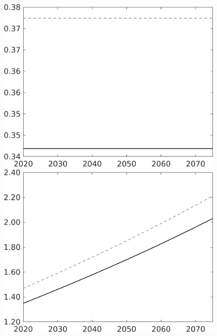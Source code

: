 \documentclass[12pt]{article}
\begin{document}
\begin{figure}[h!!]
\begin{minipage}[]{0.32\textwidth}
	\end{minipage}	
	\begin{minipage}[]{0.32\textwidth}
		\includegraphics[width=1\textwidth]{../../codding_model/own_basedOnFried/optimalPol_010922_revision/figures/all_13Sept22/CompTaul_LFBAU_Reg0_hh_spillover0_nsk1_xgr0_knspil1_sep1_countec0_GovRev0_etaa0.79_lgd0.png}
	\end{minipage}	
	\begin{minipage}[]{0.32\textwidth}
		\includegraphics[width=1\textwidth]{../../codding_model/own_basedOnFried/optimalPol_010922_revision/figures/all_13Sept22/CompTaul_LFBAU_Reg0_C_spillover0_nsk1_xgr0_knspil1_sep1_countec0_GovRev0_etaa0.79_lgd0.png}

\end{minipage}
\end{figure}
\end{document}
